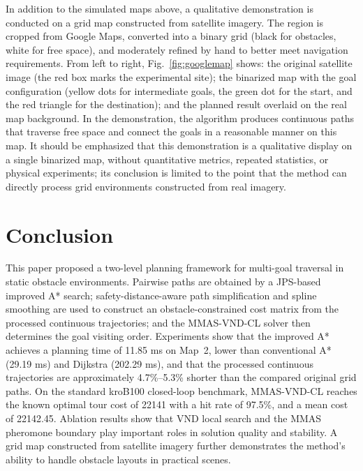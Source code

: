 \documentclass[pdflatex,sn-basic,Numbered]{sn-jnl}
\begin{document}
In addition to the simulated maps above, a qualitative demonstration is conducted on a grid map constructed from satellite imagery. The region is cropped from Google Maps, converted into a binary grid (black for obstacles, white for free space), and moderately refined by hand to better meet navigation requirements. From left to right, Fig.~\ref{fig:googlemap} shows: the original satellite image (the red box marks the experimental site); the binarized map with the goal configuration (yellow dots for intermediate goals, the green dot for the start, and the red triangle for the destination); and the planned result overlaid on the real map background. In the demonstration, the algorithm produces continuous paths that traverse free space and connect the goals in a reasonable manner on this map. It should be emphasized that this demonstration is a qualitative display on a single binarized map, without quantitative metrics, repeated statistics, or physical experiments; its conclusion is limited to the point that the method can directly process grid environments constructed from real imagery.

\section{Conclusion}
\label{sec:concl}

This paper proposed a two-level planning framework for multi-goal traversal in static obstacle environments. Pairwise paths are obtained by a JPS-based improved A* search; safety-distance-aware path simplification and spline smoothing are used to construct an obstacle-constrained cost matrix from the processed continuous trajectories; and the MMAS-VND-CL solver then determines the goal visiting order. Experiments show that the improved A* achieves a planning time of 11.85 ms on Map~2, lower than conventional A* (29.19 ms) and Dijkstra (202.29 ms), and that the processed continuous trajectories are approximately 4.7\%--5.3\% shorter than the compared original grid paths. On the standard kroB100 closed-loop benchmark, MMAS-VND-CL reaches the known optimal tour cost of 22141 with a hit rate of 97.5\%, and a mean cost of 22142.45. Ablation results show that VND local search and the MMAS pheromone boundary play important roles in solution quality and stability. A grid map constructed from satellite imagery further demonstrates the method's ability to handle obstacle layouts in practical scenes.



\backmatter
\end{document}
